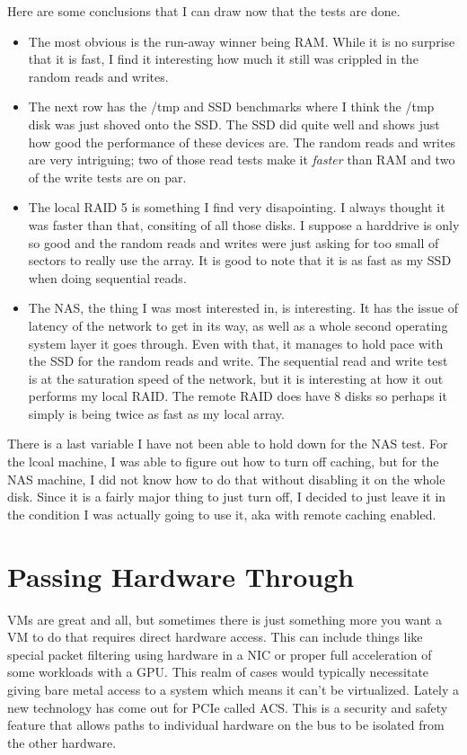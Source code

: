 \documentclass[12pt]{article}
\begin{document}
\clearpage
Here are some conclusions that I can draw now that the tests are done.
\begin{itemize}
	\item The most obvious is the run-away winner being RAM.
	While it is no surprise that it is fast, I find it interesting how much it still was crippled in the random reads and writes.
	\item The next row has the /tmp and SSD benchmarks where I think the /tmp disk was just shoved onto the SSD.
	The SSD did quite well and shows just how good the performance of these devices are.
	The random reads and writes are very intriguing; two of those read tests make it \textit{faster} than RAM and two of the write tests are on par.
	\item The local RAID 5 is something I find very disapointing.
	I always thought it was faster than that, consiting of all those disks.
	I suppose a harddrive is only so good and the random reads and writes were just asking for too small of sectors to really use the array.
	It is good to note that it is as fast as my SSD when doing sequential reads.
	\item The NAS, the thing I was most interested in, is interesting.
	It has the issue of latency of the network to get in its way, as well as a whole second operating system layer it goes through.
	Even with that, it manages to hold pace with the SSD for the random reads and write.
	The sequential read and write test is at the saturation speed of the network, but it is interesting at how it out performs my local RAID.
	The remote RAID does have 8 disks so perhaps it simply is being twice as fast as my local array.
\end{itemize}

There is a last variable I have not been able to hold down for the NAS test.
For the lcoal machine, I was able to figure out how to turn off caching, but for the NAS machine, I did not know how to do that without disabling it on the whole disk.
Since it is a fairly major thing to just turn off, I decided to just leave it in the condition I was actually going to use it, aka with remote caching enabled.

\section{Passing Hardware Through}

VMs are great and all, but sometimes there is just something more you want a VM to do that requires direct hardware access.
This can include things like special packet filtering using hardware in a NIC or proper full acceleration of some workloads with a GPU.
This realm of cases would typically necessitate giving bare metal access to a system which means it can't be virtualized.
Lately a new technology has come out for PCIe called ACS.
This is a security and safety feature that allows paths to individual hardware on the bus to be isolated from the other hardware.
\end{document}
